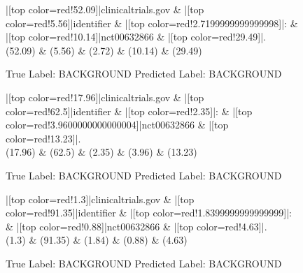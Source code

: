 \documentclass[a4paper, landscape]{article}
\begin{document}
\clearpage
\begin{figure}
\begin{center}
\begin{dependency}
\begin{deptext}
|[top color=red!52.09]|clinicaltrials.gov \& |[top color=red!5.56]|identifier \& |[top color=red!2.7199999999999998]|: \& |[top color=red!10.14]|nct00632866 \& |[top color=red!29.49]|.\\
(52.09) \& (5.56) \& (2.72) \& (10.14) \& (29.49)\\
\end{deptext}
\end{dependency}
\end{center}
\caption{True Label: BACKGROUND Predicted Label: BACKGROUND}
\end{figure}
\clearpage
\begin{figure}
\begin{center}
\begin{dependency}
\begin{deptext}
|[top color=red!17.96]|clinicaltrials.gov \& |[top color=red!62.5]|identifier \& |[top color=red!2.35]|: \& |[top color=red!3.9600000000000004]|nct00632866 \& |[top color=red!13.23]|.\\
(17.96) \& (62.5) \& (2.35) \& (3.96) \& (13.23)\\
\end{deptext}
\end{dependency}
\end{center}
\caption{True Label: BACKGROUND Predicted Label: BACKGROUND}
\end{figure}
\clearpage
\begin{figure}
\begin{center}
\begin{dependency}
\begin{deptext}
|[top color=red!1.3]|clinicaltrials.gov \& |[top color=red!91.35]|identifier \& |[top color=red!1.8399999999999999]|: \& |[top color=red!0.88]|nct00632866 \& |[top color=red!4.63]|.\\
(1.3) \& (91.35) \& (1.84) \& (0.88) \& (4.63)\\
\end{deptext}
\end{dependency}
\end{center}
\caption{True Label: BACKGROUND Predicted Label: BACKGROUND}
\end{figure}
\end{document}
